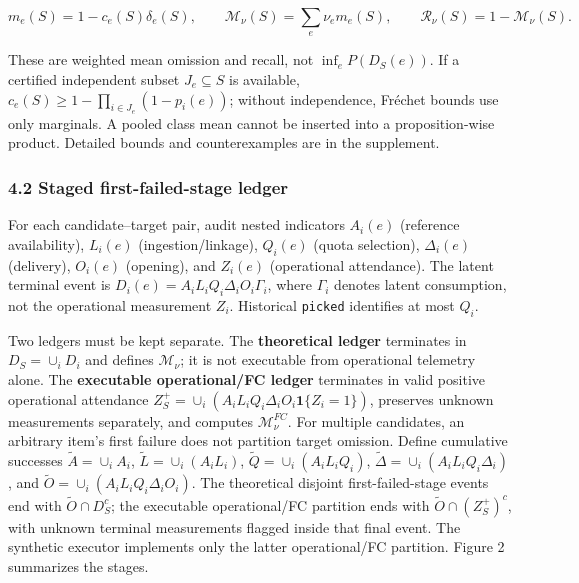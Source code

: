 \documentclass[
  11pt]{article}
\begin{document}
\[m_e(S)=1-c_e(S)\delta_e(S),\qquad \mathcal M_\nu(S)=\sum_e\nu_e m_e(S),\qquad \mathcal R_\nu(S)=1-\mathcal M_\nu(S).\tag{4}\]

These are weighted mean omission and recall, not \(\inf_e P(D_S(e))\).
If a certified independent subset \(J_e\subseteq S\) is available,
\(c_e(S)\ge1-\prod_{i\in J_e}(1-p_i(e))\); without independence, Fréchet
bounds use only marginals. A pooled class mean cannot be inserted into a
proposition-wise product. Detailed bounds and counterexamples are in the
supplement.

\subsubsection{4.2 Staged first-failed-stage
ledger}\label{staged-first-failed-stage-ledger}

For each candidate--target pair, audit nested indicators \(A_i(e)\)
(reference availability), \(L_i(e)\) (ingestion/linkage), \(Q_i(e)\)
(quota selection), \(\Delta_i(e)\) (delivery), \(O_i(e)\) (opening), and
\(Z_i(e)\) (operational attendance). The latent terminal event is
\(D_i(e)=A_iL_iQ_i\Delta_iO_i\Gamma_i\), where \(\Gamma_i\) denotes
latent consumption, not the operational measurement \(Z_i\). Historical
\texttt{picked} identifies at most \(Q_i\).

Two ledgers must be kept separate. The \textbf{theoretical ledger}
terminates in \(D_S=\cup_iD_i\) and defines \(\mathcal M_\nu\); it is
not executable from operational telemetry alone. The \textbf{executable
operational/FC ledger} terminates in valid positive operational
attendance \(Z_S^+=\cup_i(A_iL_iQ_i\Delta_iO_i\mathbf1\{Z_i=1\})\),
preserves unknown measurements separately, and computes
\(\mathcal M_\nu^{FC}\). For multiple candidates, an arbitrary item's
first failure does not partition target omission. Define cumulative
successes \(\widetilde A=\cup_iA_i\), \(\widetilde L=\cup_i(A_iL_i)\),
\(\widetilde Q=\cup_i(A_iL_iQ_i)\),
\(\widetilde\Delta=\cup_i(A_iL_iQ_i\Delta_i)\), and
\(\widetilde O=\cup_i(A_iL_iQ_i\Delta_iO_i)\). The theoretical disjoint
first-failed-stage events end with \(\widetilde O\cap D_S^c\); the
executable operational/FC partition ends with
\(\widetilde O\cap (Z_S^+)^c\), with unknown terminal measurements
flagged inside that final event. The synthetic executor implements only
the latter operational/FC partition. Figure 2 summarizes the stages.
\end{document}
